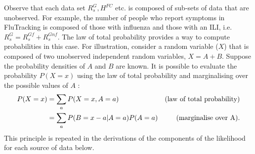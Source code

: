 \noindent Observe that each data set $R_s^G, H^{FC}$ etc. is composed of sub-sets of data that are unobserved. For example, the number of people who report symptoms in FluTracking is composed of those with influenza and those with an ILI, i.e. $R_s^G = R_s^{Gf} + R_s^{Gnf}$. The law of total probability provides a way to compute probabilities in this case. For illustration, consider a random variable ($X$) that is composed of two unobserved independent random variables, $X=A+B$. Suppose the probability densities of $A$ and $B$ are known. It is possible to evaluate the probability $P(X=x)$ using the law of total probability and marginalising over the possible values of $A$ :
\begin{align} \label{total prob} \notag
	P(X=x) &= \sum_{a} P(X=x, A=a) &\text{(law of total probability)}\\
	&= \sum_{a} P(B=x-a|A=a) P(A=a) & \text{(marginalise over A)}.
\end{align}
This principle is repeated in the derivations of the components of the likelihood for each source of data below.

